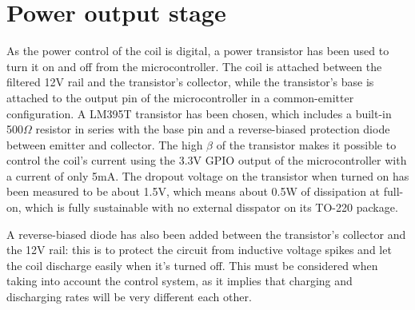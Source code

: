 \section{Power output stage}
As the power control of the coil is digital, a power transistor has been used to turn it on and off from the microcontroller. The coil is attached between the filtered 12V rail and the transistor's collector, while the transistor's base is attached to the output pin of the microcontroller in a common-emitter configuration. A LM395T transistor has been chosen, which includes a built-in 500$\Omega$ resistor in series with the base pin and a reverse-biased protection diode between emitter and collector. The high $\beta$ of the transistor makes it possible to control the coil's current using the 3.3V GPIO output of the microcontroller with a current of only 5mA. The dropout voltage on the transistor when turned on has been measured to be about 1.5V, which means about 0.5W of dissipation at full-on, which is fully sustainable with no external disspator on its TO-220 package.

A reverse-biased diode has also been added between the transistor's collector and the 12V rail: this is to protect the circuit from inductive voltage spikes and let the coil discharge easily when it's turned off. This must be considered when taking into account the control system, as it implies that charging and discharging rates will be very different each other.
